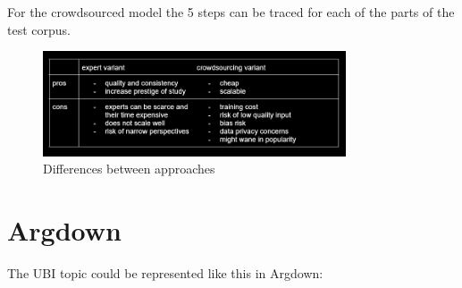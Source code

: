 \documentclass{report}
\begin{document}
For the crowdsourced model the 5 steps can be traced for each of the parts of the test corpus. 
\begin{figure}[h]
    \centering
    \includegraphics[width=0.8\textwidth]{./images/experts-vs-crowdsource.png}
    \caption{Differences between approaches}
    \label{fig:example}
\end{figure}


\section{Argdown}

The UBI topic could be represented like this in Argdown:
\end{document}
